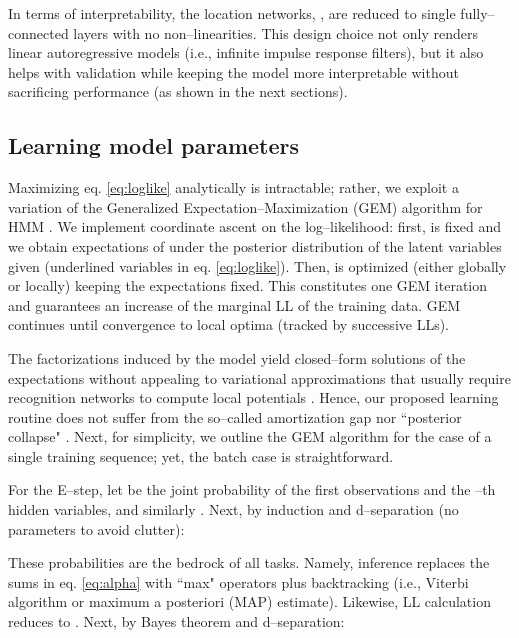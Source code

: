 \documentclass[runningheads]{llncs}
\begin{document}
In terms of interpretability, the location networks, \theta, are reduced to single fully--connected layers with no non--linearities. This design choice not only renders linear autoregressive models (i.e., infinite impulse response filters), but it also helps with validation while keeping the model more interpretable without sacrificing performance (as shown in the next sections).

\subsection{Learning model parameters}
Maximizing eq. \eqref{eq:loglike} analytically is intractable; rather, we exploit a variation of the Generalized Expectation--Maximization (GEM) algorithm for HMM \cite{rabiner1989tutorial}. We implement coordinate ascent on the log--likelihood: first, \theta is fixed and we obtain expectations of \tau\theta under the posterior distribution of the latent variables given  (underlined variables in eq. \eqref{eq:loglike}). Then, \theta is optimized (either globally or locally) keeping the expectations fixed. This constitutes one GEM iteration and guarantees an increase of the marginal LL of the training data. GEM continues until convergence to local optima (tracked by successive LLs).

The factorizations induced by the model yield closed--form solutions of the expectations without appealing to variational approximations that usually require recognition networks to compute local potentials \cite{kingma2013auto,johnson2016composing,ebbers2017hidden,krishnan2017structured,dong2020collapsed}. Hence, our proposed learning routine does not suffer from the so--called amortization gap \cite{cremer2018inference} nor ``posterior collapse" \cite{he2019lagging,dieng2019avoiding}. Next, for simplicity, we outline the GEM algorithm for the case of a single training sequence; yet, the batch case is straightforward.

For the E--step, let  be the joint probability of the first  observations and the --th hidden variables, and similarly . Next, by induction and d--separation \cite{koller2009probabilistic} (no parameters to avoid clutter):


These probabilities are the bedrock of all tasks. Namely, inference replaces the sums in eq. \eqref{eq:alpha} with ``max" operators plus backtracking (i.e., Viterbi algorithm \cite{viterbi1967error} or maximum a posteriori (MAP) estimate). Likewise, LL calculation reduces to \theta. Next, by Bayes theorem and d--separation:
\end{document}
